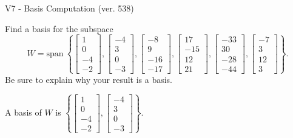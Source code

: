 \begin{exercise}
  \begin{exerciseTitle}V7 - Basis Computation (ver. 538)\end{exerciseTitle}
  \begin{exerciseStatement}
    Find a basis for the subspace 
\[W=\mathrm{span}\ \left\{\left[\begin{array}{r}
1 \\
0 \\
-4 \\
-2
\end{array}\right] , \left[\begin{array}{r}
-4 \\
3 \\
0 \\
-3
\end{array}\right] , \left[\begin{array}{r}
-8 \\
9 \\
-16 \\
-17
\end{array}\right] , \left[\begin{array}{r}
17 \\
-15 \\
12 \\
21
\end{array}\right] , \left[\begin{array}{r}
-33 \\
30 \\
-28 \\
-44
\end{array}\right] , \left[\begin{array}{r}
-7 \\
3 \\
12 \\
3
\end{array}\right]\right\}.\]
 Be sure to explain why your result is a basis.


  \end{exerciseStatement}
  \begin{exerciseAnswer}
   A basis of \(W\) is  \(\left\{\left[\begin{array}{r}
1 \\
0 \\
-4 \\
-2
\end{array}\right] , \left[\begin{array}{r}
-4 \\
3 \\
0 \\
-3
\end{array}\right]\right\}\).
  


  \end{exerciseAnswer}
\end{exercise}